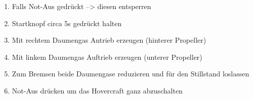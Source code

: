 \begin{enumerate}
    \item Falls Not-Aus gedrückt --> diesen entsperren
    \item Startknopf circa 5s gedrückt halten    
    \item Mit rechtem Daumengas Antrieb erzeugen (hinterer Propeller)
    \item Mit linkem Daumengas Auftrieb erzeugen (unterer Propeller)
    \item Zum Bremsen beide Daumengase reduzieren und für den Stillstand loslassen
    \item Not-Aus drücken um das Hovercraft ganz abzuschalten
\end{enumerate}